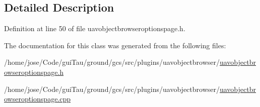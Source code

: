 \subsection{Detailed Description}


Definition at line 50 of file uavobjectbrowseroptionspage.\-h.



The documentation for this class was generated from the following files\-:\begin{DoxyCompactItemize}
\item 
/home/jose/\-Code/gui\-Tau/ground/gcs/src/plugins/uavobjectbrowser/\hyperlink{uavobjectbrowseroptionspage_8h}{uavobjectbrowseroptionspage.\-h}\item 
/home/jose/\-Code/gui\-Tau/ground/gcs/src/plugins/uavobjectbrowser/\hyperlink{uavobjectbrowseroptionspage_8cpp}{uavobjectbrowseroptionspage.\-cpp}\end{DoxyCompactItemize}
